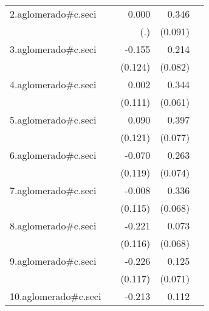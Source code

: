 {\begin{longtable}{l*{4}{D{.}{.}{-1}}}
\addlinespace
2.aglomerado#c.seci&                     &       0.000         &       0.346\sym{***}&                     \\
            &                     &         (.)         &     (0.091)         &                     \\
\addlinespace
3.aglomerado#c.seci&                     &      -0.155         &       0.214\sym{**} &                     \\
            &                     &     (0.124)         &     (0.082)         &                     \\
\addlinespace
4.aglomerado#c.seci&                     &       0.002         &       0.344\sym{***}&                     \\
            &                     &     (0.111)         &     (0.061)         &                     \\
\addlinespace
5.aglomerado#c.seci&                     &       0.090         &       0.397\sym{***}&                     \\
            &                     &     (0.121)         &     (0.077)         &                     \\
\addlinespace
6.aglomerado#c.seci&                     &      -0.070         &       0.263\sym{***}&                     \\
            &                     &     (0.119)         &     (0.074)         &                     \\
\addlinespace
7.aglomerado#c.seci&                     &      -0.008         &       0.336\sym{***}&                     \\
            &                     &     (0.115)         &     (0.068)         &                     \\
\addlinespace
8.aglomerado#c.seci&                     &      -0.221         &       0.073         &                     \\
            &                     &     (0.116)         &     (0.068)         &                     \\
\addlinespace
9.aglomerado#c.seci&                     &      -0.226         &       0.125         &                     \\
            &                     &     (0.117)         &     (0.071)         &                     \\
\addlinespace
10.aglomerado#c.seci&                     &      -0.213         &       0.112         &                     \\

\end{longtable}}
